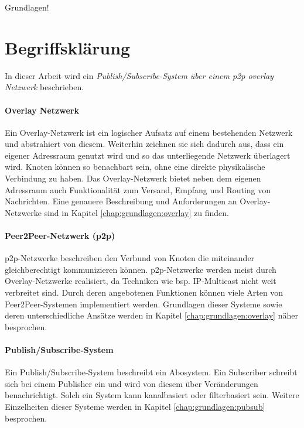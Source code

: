 Grundlagen!
\section{Begriffsklärung}
In dieser Arbeit wird ein \emph{Publish/Subscribe-System über einem p2p overlay Netzwerk} beschrieben.

\paragraph{Overlay Netzwerk} Ein Overlay-Netzwerk ist ein logischer Aufsatz auf einem bestehenden Netzwerk und abstrahiert von diesem. Weiterhin zeichnen sie sich dadurch aus, dass ein eigener Adressraum genutzt wird und so das unterliegende Netzwerk überlagert wird. Knoten können so benachbart sein, ohne eine direkte physikalische Verbindung zu haben. Das Overlay-Netzwerk bietet neben dem eigenen Adressraum auch Funktionalität zum Versand, Empfang und Routing von Nachrichten. Eine genauere Beschreibung und Anforderungen an Overlay-Netzwerke sind in Kapitel \ref{chap:grundlagen:overlay} zu finden.


\paragraph{Peer2Peer-Netzwerk (p2p)} p2p-Netzwerke beschreiben den Verbund von Knoten die miteinander gleichberechtigt kommunizieren können. p2p-Netzwerke werden meist durch Overlay-Netzwerke realisiert, da Techniken wie bsp. IP-Multicast nicht weit verbreitet sind. Durch deren angebotenen Funktionen können viele Arten von Peer2Peer-Systemen implementiert werden. Grundlagen dieser Systeme sowie deren unterschiedliche Ansätze werden in Kapitel \ref{chap:grundlagen:overlay} näher besprochen.


\paragraph{Publish/Subscribe-System} Ein Publish/Subscribe-System beschreibt ein Abosystem. Ein Subscriber schreibt sich bei einem Publisher ein und wird von diesem über Veränderungen benachrichtigt. Solch ein System kann kanalbasiert oder filterbasiert sein. Weitere Einzelheiten dieser Systeme werden in Kapitel \ref{chap:grundlagen:pubsub} besprochen.


